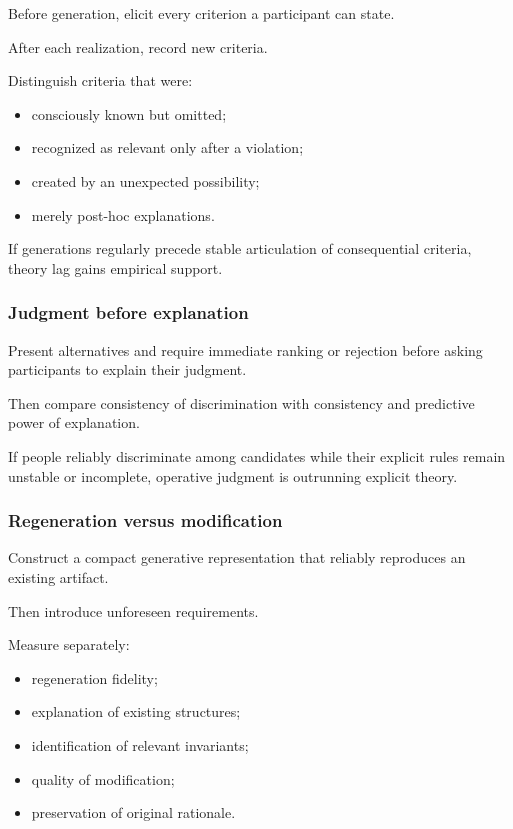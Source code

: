 \documentclass[
]{article}
\providecommand{\tightlist}{%
  \setlength{\itemsep}{0pt}\setlength{\parskip}{0pt}}
\begin{document}
Before generation, elicit every criterion a participant can state.

After each realization, record new criteria.

Distinguish criteria that were:

\begin{itemize}
\tightlist
\item
  consciously known but omitted;
\item
  recognized as relevant only after a violation;
\item
  created by an unexpected possibility;
\item
  merely post-hoc explanations.
\end{itemize}

If generations regularly precede stable articulation of consequential
criteria, theory lag gains empirical support.

\subsubsection{Judgment before
explanation}\label{judgment-before-explanation}

Present alternatives and require immediate ranking or rejection before
asking participants to explain their judgment.

Then compare consistency of discrimination with consistency and
predictive power of explanation.

If people reliably discriminate among candidates while their explicit
rules remain unstable or incomplete, operative judgment is outrunning
explicit theory.

\subsubsection{Regeneration versus
modification}\label{regeneration-versus-modification}

Construct a compact generative representation that reliably reproduces
an existing artifact.

Then introduce unforeseen requirements.

Measure separately:

\begin{itemize}
\tightlist
\item
  regeneration fidelity;
\item
  explanation of existing structures;
\item
  identification of relevant invariants;
\item
  quality of modification;
\item
  preservation of original rationale.
\end{itemize}
\end{document}
